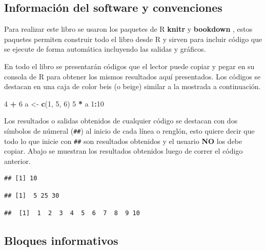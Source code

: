 \documentclass[10pt,]{krantz}
\makeatletter
\newenvironment{Shaded}{\begin{snugshade}}{\end{snugshade}}
\newcommand{\KeywordTok}[1]{\textcolor[rgb]{0.13,0.29,0.53}{\textbf{#1}}}
\newcommand{\DecValTok}[1]{\textcolor[rgb]{0.00,0.00,0.81}{#1}}
\newcommand{\StringTok}[1]{\textcolor[rgb]{0.31,0.60,0.02}{#1}}
\newcommand{\OperatorTok}[1]{\textcolor[rgb]{0.81,0.36,0.00}{\textbf{#1}}}
\newcommand{\NormalTok}[1]{#1}
\newenvironment{kframe}{%
\medskip{}
\setlength{\fboxsep}{.8em}
 \def\at@end@of@kframe{}%
 \ifinner\ifhmode%
  \def\at@end@of@kframe{\end{minipage}}%
  \begin{minipage}{\columnwidth}%
 \fi\fi%
 \def\FrameCommand##1{\hskip\@totalleftmargin \hskip-\fboxsep
 \colorbox{shadecolor}{##1}\hskip-\fboxsep
     \hskip-\linewidth \hskip-\@totalleftmargin \hskip\columnwidth}%
 \MakeFramed {\advance\hsize-\width
   \@totalleftmargin\z@ \linewidth\hsize
   \@setminipage}}%
 {\par\unskip\endMakeFramed%
 \at@end@of@kframe}
\renewenvironment{Shaded}{\begin{kframe}}{\end{kframe}}
\makeatother
\begin{document}
\subsection*{Información del software y
convenciones}\label{informacion-del-software-y-convenciones}

Para realizar este libro se usaron los paquetes de R
\textbf{knitr} \citep{xie2015} y
\textbf{bookdown} \citep{R-bookdown}, estos paquetes
permiten construir todo el libro desde R y sirven para incluir código
que se ejecute de forma automática incluyendo las salidas y gráficos.

En todo el libro se presentarán códigos que el lector puede copiar y
pegar en su consola de R para obtener los mismos resultados aquí
presentados. Los códigos se destacan en una caja de color beis (o beige)
similar a la mostrada a continuación.

\begin{Shaded}
\begin{Highlighting}[]
\DecValTok{4} \OperatorTok{+}\StringTok{ }\DecValTok{6}
\NormalTok{a <-}\StringTok{ }\KeywordTok{c}\NormalTok{(}\DecValTok{1}\NormalTok{, }\DecValTok{5}\NormalTok{, }\DecValTok{6}\NormalTok{)}
\DecValTok{5} \OperatorTok{*}\StringTok{ }\NormalTok{a}
\DecValTok{1}\OperatorTok{:}\DecValTok{10}
\end{Highlighting}
\end{Shaded}

Los resultados o salidas obtenidos de cualquier código se destacan con
dos símbolos de númeral (\texttt{\#\#}) al inicio de cada línea o
renglón, esto quiere decir que todo lo que inicie con \texttt{\#\#} son
resultados obtenidos y el usuario \textbf{NO} los debe copiar. Abajo se
muestran los resultados obtenidos luego de correr el código anterior.

\begin{verbatim}
## [1] 10
\end{verbatim}

\begin{verbatim}
## [1]  5 25 30
\end{verbatim}

\begin{verbatim}
##  [1]  1  2  3  4  5  6  7  8  9 10
\end{verbatim}

\subsection*{Bloques informativos}\label{bloques-informativos}
\end{document}

